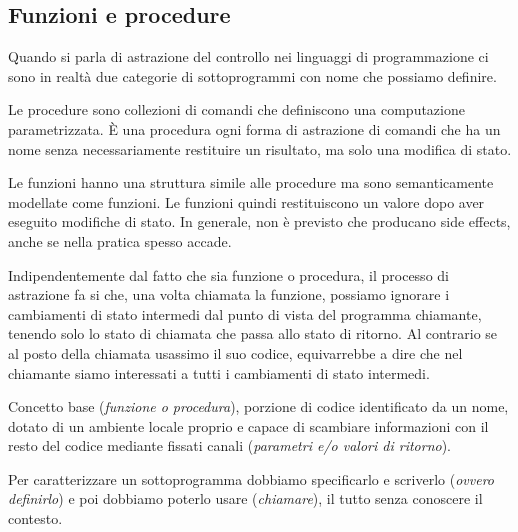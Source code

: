 \documentclass[oneside,a4paper,11pt]{book}
\theoremstyle{italicstyle}
\theoremstyle{normStyle}
\begin{document}
\subsection{Funzioni e procedure}
Quando si parla di astrazione del controllo nei linguaggi di programmazione ci sono in realtà 
due categorie di sottoprogrammi con nome che possiamo definire.
\begin{tcolorbox}[title ={Procedure}]
  Le procedure sono collezioni di comandi che definiscono una computazione parametrizzata. È una 
  procedura ogni forma di astrazione di comandi che ha un nome senza necessariamente 
  restituire un risultato, ma solo una modifica di stato.
\end{tcolorbox}
\begin{tcolorbox}[title = {Funzioni}]
  Le funzioni hanno una struttura simile alle procedure ma sono semanticamente 
  modellate come funzioni. Le funzioni quindi restituiscono un valore dopo aver 
  eseguito modifiche di stato. In generale, non è previsto che producano 
  side effects, anche se nella pratica spesso accade.
\end{tcolorbox}
Indipendentemente dal fatto che sia funzione o procedura, il processo di astrazione fa si che, una volta 
chiamata la funzione, possiamo ignorare i cambiamenti di stato intermedi dal punto di
vista del programma chiamante, tenendo solo lo stato di chiamata che passa allo stato di ritorno.
Al contrario se al posto della chiamata usassimo il suo codice, equivarrebbe a dire che nel chiamante 
siamo interessati a tutti i cambiamenti di stato intermedi.
\begin{tcolorbox}[title ={Sottoprogramma}]
  Concetto base (\textit{funzione o procedura}), porzione di codice identificato da un nome, dotato 
  di  un ambiente locale proprio e capace di scambiare informazioni con il resto del 
  codice mediante fissati canali (\textit{parametri e/o valori di ritorno}).
\end{tcolorbox}
Per caratterizzare un sottoprogramma dobbiamo specificarlo e scriverlo (\textit{ovvero 
definirlo}) e poi dobbiamo poterlo usare (\textit{chiamare}), il tutto senza conoscere il 
contesto.
\end{document}

